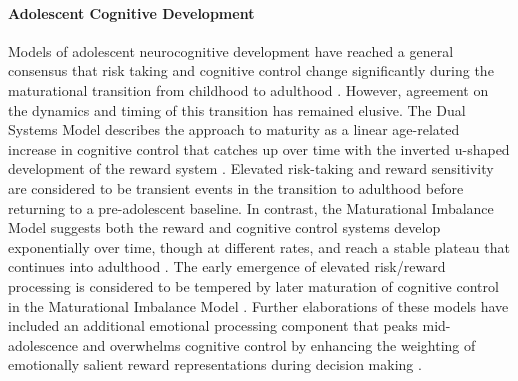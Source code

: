 \documentclass{article}%
\begin{document}
\paragraph*{Adolescent Cognitive Development} Models of adolescent neurocognitive development have reached a general consensus that risk taking and cognitive control change significantly during the maturational transition from childhood to adulthood \citep{Steinberg2010}. However, agreement on the dynamics and timing of this transition has remained elusive. The Dual Systems Model describes the approach to maturity as a linear age-related increase in cognitive control that catches up over time with the inverted u-shaped development of the reward system \citep{Steinberg2005}. Elevated risk-taking and reward sensitivity are considered to be transient events in the transition to adulthood before returning to a pre-adolescent baseline. In contrast, the Maturational Imbalance Model suggests both the reward and cognitive control systems develop exponentially over time, though at different rates, and reach a stable plateau that continues into adulthood \citep{CaseyEtAl2008}. The early emergence of elevated risk/reward processing is considered to be tempered by later maturation of cognitive control in the Maturational Imbalance Model \citep{somerville2010developmental}. Further elaborations of these models have included an additional emotional processing component that peaks mid-adolescence and overwhelms cognitive control by enhancing the weighting of emotionally salient reward representations during decision making \citep{casey2019development}.
\vspace{4pt}
\end{document}
